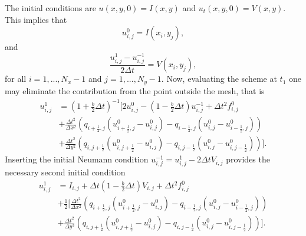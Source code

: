 \documentclass[11pt]{article}
\begin{document}
The initial conditions are $u(x,y,0)= I(x,y)$ and $u_t(x,y,0)=V(x,y)$. This implies that
\begin{equation}
u_{i,j}^0 = I(x_i, y_j), 
\end{equation}
 and
 \begin{equation*}
 \frac{u_{i,j}^{1} - u_{i,j}^{-1}}{2 \Delta t} = V(x_i,y_j),
 \end{equation*}
 for all  $i=1, ..., N_x - 1$ and $j=1, ..., N_y - 1$.
 Now, evaluating the scheme at $t_1$ one may eliminate the contribution from the point outside the mesh, that is
\begin{align*}
u_{i,j}^{1} &= (1+\frac{b}{2}\Delta t)^{-1} \bigg[2u_{i,j}^0 - (1-\frac{b}{2}\Delta t) u_{i,j}^{-1} + \Delta t^2 f_{i,j}^0 \nonumber \\
&+ \frac{\Delta t^2}{\Delta x^2} \left(q_{i+\frac{1}{2},j} (u_{i+\frac{1}{2},j}^0 - u_{i,j}^0) -  q_{i-\frac{1}{2},j} (u_{i,j}^0 - u_{i-\frac{1}{2},j}^0) \right) \\
&+ \frac{\Delta t^2}{\Delta y^2} \left(q_{i,j+\frac{1}{2}} (u_{i,j+\frac{1}{2}}^0 - u_{i,j}^0) -  q_{i,j-\frac{1}{2}} (u_{i,j}^0 - u_{i,j-\frac{1}{2}}^0) \right) \bigg]. \nonumber
\end{align*}
Inserting the initial Neumann condition $u_{i,j}^{-1} = u_{i,j}^1 - 2\Delta t V_{i,j}$ provides the necessary second initial condition
\begin{align}
u_{i,j}^1 &= I_{i,j} + \Delta t(1- \frac{b}{2} \Delta t) V_{i,j} + \Delta t^2 f_{i,j}^0 \nonumber \\
&+ \frac{1}{2} \bigg[\frac{\Delta t^2}{\Delta x^2} \left(q_{i+\frac{1}{2},j} (u_{i+\frac{1}{2},j}^0 - u_{i,j}^0) -  q_{i-\frac{1}{2},j} (u_{i,j}^0 - u_{i-\frac{1}{2},j}^0) \right) \\
&+ \frac{\Delta t^2}{\Delta y^2} \left(q_{i,j+\frac{1}{2}} (u_{i,j+\frac{1}{2}}^0 - u_{i,j}^0) -  q_{i,j-\frac{1}{2}} (u_{i,j}^0 - u_{i,j-\frac{1}{2}}^0) \right) \bigg]. \nonumber
\end{align}
\end{document}
